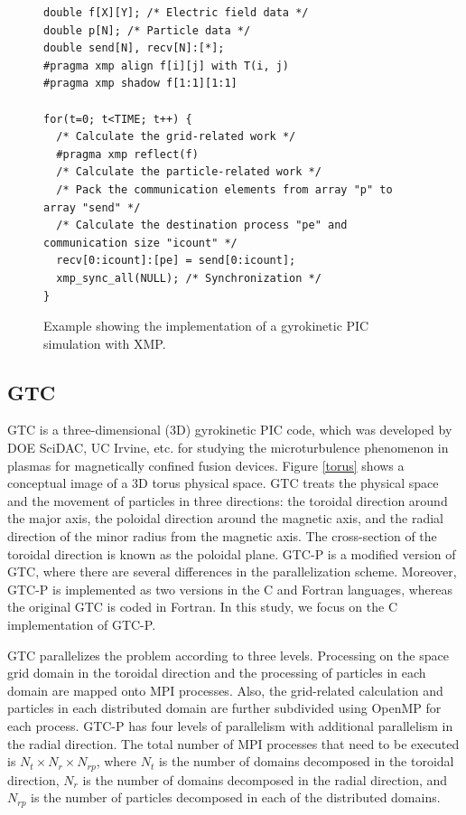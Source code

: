 \begin{figure}[t]
\centering
{\scriptsize
\begin{minipage}{11cm}
\begin{lstlisting}
double f[X][Y]; /* Electric field data */
double p[N]; /* Particle data */
double send[N], recv[N]:[*];
#pragma xmp align f[i][j] with T(i, j)
#pragma xmp shadow f[1:1][1:1]

for(t=0; t<TIME; t++) {
  /* Calculate the grid-related work */
  #pragma xmp reflect(f)
  /* Calculate the particle-related work */
  /* Pack the communication elements from array "p" to array "send" */
  /* Calculate the destination process "pe" and communication size "icount" */
  recv[0:icount]:[pe] = send[0:icount];
  xmp_sync_all(NULL); /* Synchronization */
}
\end{lstlisting}
\end{minipage}
}
\caption{Example showing the implementation of a gyrokinetic PIC simulation with XMP.}
\label{picxmp}
\end{figure}


\subsection{GTC}
GTC is a three-dimensional (3D) gyrokinetic PIC code, which was developed by DOE SciDAC, UC Irvine, etc.\cite{GTC} for studying the microturbulence phenomenon in plasmas for magnetically confined fusion devices. Figure \ref{torus} shows a conceptual image of a 3D torus physical space. GTC treats the physical space and the movement of particles in three directions: the toroidal direction around the major axis, the poloidal direction around the magnetic axis, and the radial direction of the minor radius from the magnetic axis. The cross-section of the toroidal direction is known as the poloidal plane. GTC-P is a modified version of GTC, where there are several differences in the parallelization scheme. Moreover, GTC-P is implemented as two versions in the C and Fortran languages, whereas the original GTC is coded in Fortran. In this study, we focus on the C implementation of GTC-P.

GTC parallelizes the problem according to three levels. Processing on the space grid domain in the toroidal direction and the processing of particles in each domain are mapped onto MPI processes. Also, the grid-related calculation and particles in each distributed domain are further subdivided using OpenMP for each process. GTC-P has four levels of parallelism with additional parallelism in the radial direction. The total number of MPI processes that need to be executed is $N_t \times N_r \times N_{rp}$, where $N_t$ is the number of domains decomposed in the toroidal direction, $N_r$ is the number of domains decomposed in the radial direction, and $N_{rp}$ is the number of particles decomposed in each of the distributed domains.

